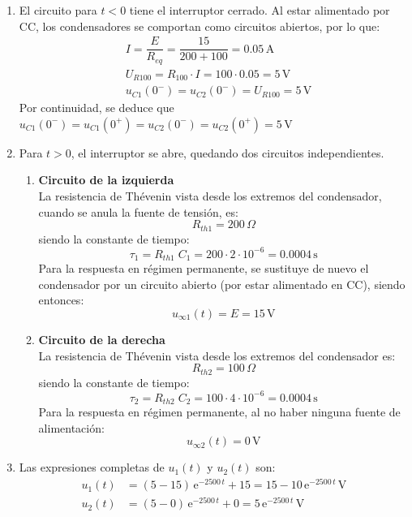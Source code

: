 \begin{enumerate}
    \item El circuito para $t<0$ tiene el interruptor cerrado. Al estar alimentado por CC, los condensadores se comportan como circuitos abiertos, por lo que:
    \begin{align*}
        &I=\dfrac{E}{R_{eq}}=\dfrac{15}{200+100}=0.05\,\si{\ampere}\\
        &U_{R100}=R_{100}\cdot I=100\cdot 0.05=5\,\si{\volt}\\
        &u_{C1}(0^-)=u_{C2}(0^-)=U_{R100}=5\,\si{\volt}
    \end{align*}
    Por continuidad, se deduce que $u_{C1}(0^-)=u_{C1}(0^+)=u_{C2}(0^-)=u_{C2}(0^+)=5\,\si{\volt}$
    \item Para $t>0$, el interruptor se abre, quedando dos circuitos independientes. 
    \begin{enumerate}
        \item \textbf{Circuito de la izquierda}\\
        La resistencia de Thévenin vista desde los extremos del condensador, cuando se anula la fuente de tensión, es:
    \begin{equation*}
        R_{th1}=200\,\Omega
    \end{equation*}
    siendo la constante de tiempo:
    \begin{equation*}
        \tau_1=R_{th1}\;C_1=200\cdot 2\cdot10^{-6}=0.0004\,\si{\second}
    \end{equation*}
    Para la respuesta en régimen permanente, se sustituye de nuevo el condensador por un circuito abierto (por estar alimentado en CC), siendo entonces:
    \begin{equation*}
        u_{\infty1}(t)=E=15\,\si{\volt}
    \end{equation*}
    \item \textbf{Circuito de la derecha}\\
        La resistencia de Thévenin vista desde los extremos del condensador es:
    \begin{equation*}
        R_{th2}=100\,\Omega
    \end{equation*}
    siendo la constante de tiempo:
    \begin{equation*}
        \tau_2=R_{th2}\;C_2=100\cdot 4\cdot10^{-6}=0.0004\,\si{\second}
    \end{equation*}
    Para la respuesta en régimen permanente, al no haber ninguna fuente de alimentación:
    \begin{equation*}
        u_{\infty2}(t)=0\,\si{\volt}
    \end{equation*}
    \end{enumerate}
    \item Las expresiones completas de $u_1(t)$ y $u_2(t)$ son:
    \begin{align*}
        u_1(t)&=\left(5-15 \right)\,\mathrm{e}^{-2500\,t}+15=15-10\,\mathrm{e}^{-2500\,t}\,\si{\volt}\\
        u_2(t)&=\left(5-0 \right)\,\mathrm{e}^{-2500\,t}+0=5\,\mathrm{e}^{-2500\,t}\,\si{\volt}
    \end{align*}
\end{enumerate}


